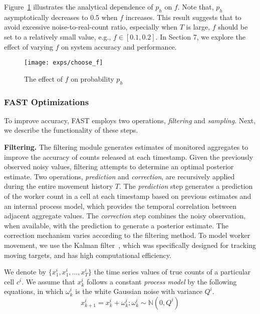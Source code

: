 \documentclass{USC-Thesis}
\numberwithin{equation}{chapter}
\begin{document}
Figure~\ref{fig:choose_f} illustrates the analytical dependence of $p_h$ on $f$. Note that, $p_h$ asymptotically decreases to 0.5 when $f$ increases. This result suggests that to avoid excessive noise-to-real-count ratio, especially when $T$ is large, $f$ should be set to a relatively small value, e.g., $f \in [0.1,0.2]$. In Section 7, we explore the effect of varying $f$ on system accuracy and performance.

\begin{figure}[!htb]\centering
  \texttt{[image: exps/choose\_f]}
  \caption{The effect of $f$ on probability $p_h$}
  \label{fig:choose_f}
\end{figure}

\subsubsection{FAST Optimizations}

To improve accuracy, FAST employs two operations, {\em filtering} and {\em sampling}. Next, we describe the functionality of these steps.

\noindent
\textbf{Filtering.}
The filtering module generates estimates of monitored aggregates to improve the accuracy of counts released at each timestamp.   
Given the previously observed noisy values, filtering attempts to determine an optimal posterior estimate.  Two operations, \textit{prediction} and \textit{correction}, are recursively applied during the entire movement history $T$.   The \textit{prediction} step generates a prediction of the worker count in a cell at each timestamp based on previous estimates and an internal process model, which provides the temporal correlation between adjacent aggregate values.  The \textit{correction} step combines the noisy observation, when available, with the prediction to generate a posterior estimate.  The correction mechanism varies according to the filtering method. To model worker movement, we use the Kalman filter~\cite{KALMAN60}, which was specifically designed for tracking moving targets, and has high computational efficiency.

We denote by $\{x_1^i,x_1^i,...,x_T^i\}$ the time series values of true counts of a particular cell $c^i$. We assume that $x_k^i$ follows a constant \textit{process model} by the following equations, in which $\omega^i_k$ is the white Gaussian noise with variance $Q^i$.
\begin{equation}
x_{k+1}^i = x_k^i + \omega^i_k ; \omega^i_k \sim  \mathbb{N}(0, Q^i)
\label{eq:linear_model}
\end{equation}
\end{document}
